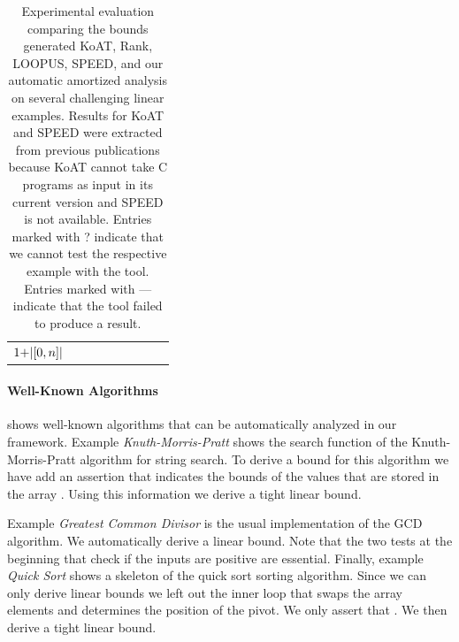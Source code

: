 \documentclass[nocopyrightspace,preprint,pldi]{sigplanconf-pldi15}
\newcommand{\iffull}[2]{\ifx\fullversion\undefined{#2}\else{#1}\fi}
\newcommand{\ifshort}[2]{\ifx\fullversion\undefined{#1}\else{#2}\fi}
\newcommand{\sectskip}[0]{\ifshort{\vspace{-3pt}}{}}
\newcommand{\pref}[1]{\prettyref{#1}}
\begin{document}
{\begin{table}
\begin{tabular}{r|C{1.1cm}c|C{1.8cm}c|C{1.9cm}c|C{1.8cm}|C{2.65cm}}
$1 {+} |[0,n]|$
\\

\end{tabular}
\caption{
  Experimental evaluation comparing the bounds generated KoAT, Rank,
  LOOPUS, SPEED, and our automatic amortized analysis on several
  challenging linear examples. Results for KoAT and SPEED were extracted
  from previous publications because KoAT cannot take C programs as
  input in its current version and SPEED is not available.
  Entries marked with ? indicate that we cannot test the respective example with the tool. Entries
  marked with --- indicate that the tool failed to produce a result.
}
\label{tab:eval}
\end{table}

\paragraph{Well-Known Algorithms}

\pref{fig:cat3} shows well-known algorithms that can be automatically
analyzed in our framework.  Example \emph{Knuth-Morris-Pratt} shows
the search function of the Knuth-Morris-Pratt algorithm for string
search.  To derive a bound for this algorithm we have add an assertion
that indicates the bounds of the values that are stored in the array
.  Using this information we derive a tight linear bound.

Example \emph{Greatest Common Divisor} is the usual implementation of
the GCD algorithm.  We automatically derive a linear bound.  Note that
the two tests at the beginning that check if the inputs are positive
are essential.  Finally, example \emph{Quick Sort} shows a skeleton of
the quick sort sorting algorithm.  Since we can only derive linear
bounds we left out the inner loop that swaps the array elements and
determines the position  of the pivot.  We only assert that
.  We then derive a tight linear bound.

}\fi


\iffull{

}
{
\sectskip
\scriptsize

}
\end{document}
